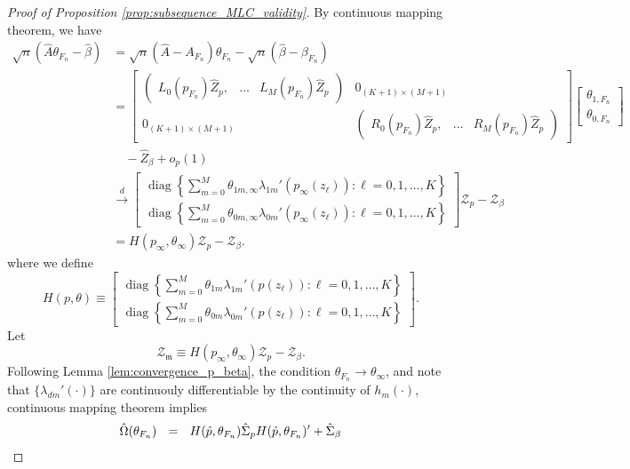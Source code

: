 \documentclass[11pt]{article}
\theoremstyle{definition}
\DeclareMathOperator*{\diag}{diag}
\newcommand{\0}{\ensuremath{\mathbf{0}}}
\begin{document}
\begin{bibunit}
\begin{proof}[Proof of Proposition \ref{prop:subsequence_MLC_validity}]
By continuous mapping theorem, we have 
\begin{align*}
	\sqrt{n}(\hat{A}\theta_{F_n} - \hat{\beta})
	&= \sqrt{n}(\hat{A} - A_{F_n})\theta_{F_n} - \sqrt{n}(\hat{\beta} - \beta_{F_n}) \\
	&= \begin{bmatrix}
		\begin{pmatrix}
			L_0({p}_{F_n})\hat{Z}_p, & \ldots & L_M({p}_{F_n})\hat{Z}_p  
		\end{pmatrix}
		& 0_{(K+1)\times(M+1)} \\
		0_{(K+1)\times (M+1)} & 
		\begin{pmatrix}
			R_0({p}_{F_n})\hat{Z}_p, & \ldots & R_M({p}_{F_n})\hat{Z}_p  
		\end{pmatrix}
	\end{bmatrix}
	\begin{bmatrix}
	\theta_{1,F_n} \\
	\theta_{0,F_n}
	\end{bmatrix} \\
	  & \quad - \hat{Z}_\beta + o_p(1) \\
	&\xrightarrow{d}
	\begin{bmatrix}
		\diag\left\{\sum_{m=0}^M \theta_{1m,\infty} \lambda_{1m}'({p}_{\infty}(z_\ell)): \ell = 0,1,\ldots, K\right\} \\
		\diag\left\{\sum_{m=0}^M \theta_{0m,\infty} \lambda_{0m}'({p}_{\infty}(z_\ell)): \ell = 0,1,\ldots, K\right\}
	\end{bmatrix} 
	\mathcal{Z}_p - \mathcal{Z}_\beta\\
	&= H(p_\infty,\theta_\infty)\mathcal{Z}_p - \mathcal{Z}_\beta.
\end{align*}
where we define
	\[
		H(p,\theta) 
		\equiv
		\begin{bmatrix}
			\diag\left\{\sum_{m=0}^M \theta_{1m} \lambda_{1m}'({p}(z_{\ell})): \ell = 0,1,\ldots, K\right\} \\
			\diag\left\{\sum_{m=0}^M \theta_{0m} \lambda_{0m}'({p}(z_{\ell})): \ell = 0,1,\ldots, K\right\}
		\end{bmatrix}.
	\]
Let 
\[
	\mathcal{Z}_{\mathfrak{m}} \equiv H(p_\infty,\theta_\infty)\mathcal{Z}_p - \mathcal{Z}_\beta.
\] 
Following Lemma \ref{lem:convergence_p_beta}, the condition $\theta_{F_n} \to \theta_{\infty}$, and note that $\{\lambda_{dm}'(\cdot)\}$ are continuouly differentiable by the continuity of $h_m(\cdot)$, continuous mapping theorem implies
\begin{align}
	\hat{\Omega}(\theta_{F_n}) 
	&~~=~~ H(\hat{p}, \theta_{F_n}) \hat{\Sigma}_p H(\hat{p}, \theta_{F_n})' + \hat{\Sigma}_\beta \notag \\

\end{align}
\end{proof}
\end{bibunit}
\end{document}
